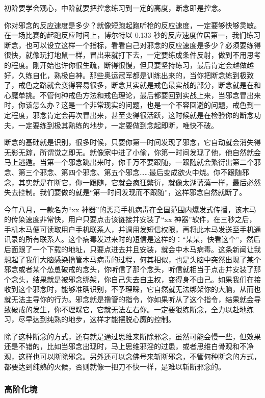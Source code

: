 初阶要学会观心，中阶就要把控念练习到一定的高度，断念即是控念。

你对邪念的反应速度是多少？就像短跑起跑听枪的反应速度，一定要够快够灵敏。在一场比赛的起跑反应时间上，博尔特以 0.133 秒的反应速度位居第一，我们练习断念，也可以设立这样一个指标，看看自己对邪念的反应速度是多少？必须要练得很快，就像玩打地鼠一样，冒出来就打下去，一定要练成条件反射，做到不用思考的程度。刚开始也许你很生疏，断得很慢，但只要坚持练习，最后肯定会越做越好，久练自化，熟极自神。那些奥运冠军都是训练出来的，当你把断念练到极致了，戒色之路就会变得容易很多，断念其实就是戒色最实战的部分，断念就是在和心魔单挑。不管何种戒色方法和戒色理论，最后都要回到实战上来，当邪念冒出来时，你该怎么办？这是一个非常现实的问题，也是一个不容回避的问题，戒色到一定程度，邪念肯定会再次冒出来，甚至变得很活跃，这时候就是在检验你的断念功夫，一定要练到极其熟练的地步，一定要做到念起即断，唯快不破。

断念的基础就是识别，很多时候，只要你第一时间发现了邪念，它自动就会消失得无影无踪，所谓觉之即无。就像家中进了小偷，你第一时间发现了他，他自然就会马上逃遁。当第一个邪念跳出来时，你千万不要跟随，一跟随就会繁衍出第二个邪念、第三个邪念、第四个邪念、第五个邪念……最后变成欲火中烧。你不跟随邪念，其实就是在断它，你一跟随，它就会疯狂繁衍，就像太湖蓝藻一样，最后必然失去控制。我们要做的就是“第一时间发现而不跟随”，这样邪念自然就断了。

今年八月，一款名为“xx 神器”的恶意手机病毒在全国范围内爆发式传播，该木马的传染速度非常快，用户只要点击该链接并安装了“xx 神器”软件，在三秒之后，手机木马便可读取用户手机联系人，并调用发短信权限，再将此木马发送至手机通讯录的所有联系人。这个病毒发过来时的短信是这样的：“某某，快看这个”，然后后面跟了一个下载的地址，只要点进去并且安装，就会中木马病毒。这条新闻让我想起了我们大脑感染撸管木马病毒的过程，何其相似，也是头脑中突然出现了某个邪念或者某个怂恿破戒的念头，你听信了那个念头，听信就相当于点击并安装了那个念头，结果就是被邪念绑架，你自己失去自主权，变得身不由己。如果我们在接收到这个邪念时，能够准确识别，不予理睬，它自然就无法绑架你的大脑，从而也就无法主导你的行为。邪念就是撸管的指令，你如果听从了这个指令，结果就会导致破戒的发生，你不理睬它，它就无法左右你。一定要狠练断念，全力以赴地练习，尽早达到纯熟的地步，这样才能摆脱心魔的控制。

除了这种断念的方式，还有就是通过思维来断除邪念，虽然可能会慢一些，但效果还是不错的，比如当邪念出现时，马上思维邪淫的过患，或者思维白骨观和不净观，这样也可以断除邪念。另外还可以念佛号来斩断邪念，不管何种断念的方式，都要达到纯熟的火候，否则就像一把刀不快一样，是难以斩断邪念的。

\subsubsection{高阶化境}

